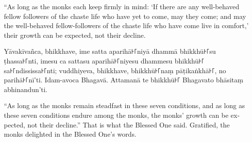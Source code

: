 \documentclass[
  babelLanguage=portuguese,
  final,
  a4Paper,
]{chantingbook}
\begin{document}
\begin{english}
  “As long as the monks each keep firmly in mind: `If there are any well-behaved
  fellow followers of the chaste life who have yet to come, may they come; and
  may the well-behaved fellow-followers of the chaste life who have come live in
  comfort,' their growth can be expected, not their decline.
\end{english}

Yāvakīvañca, bhikkhave, ime satta aparihā꜔꜒niyā dhammā bhikkhū꜔꜒su ṭhassa꜔꜒nti, imesu
ca sattasu aparihā꜔꜒niyesu dhammesu bhikkhū꜔꜒ sa꜔꜒ndississa꜔꜒nti; vuddhiyeva, bhikkhave,
bhikkhū꜔꜒naṃ pāṭikaṅkhā꜔꜒, no parihā꜔꜒nī'ti. Idam-avoca Bhagavā. Attamanā te bhikkhū꜔꜒
Bhagavato bhāsitaṃ abhinandun'ti.

\begin{english}
  “As long as the monks remain steadfast in these seven conditions, and as long
  as these seven conditions endure among the monks, the monks' growth can be
  expected, not their decline.” That is what the Blessed One said. Gratified,
  the monks delighted in the Blessed One's words.
\end{english}
\end{document}
